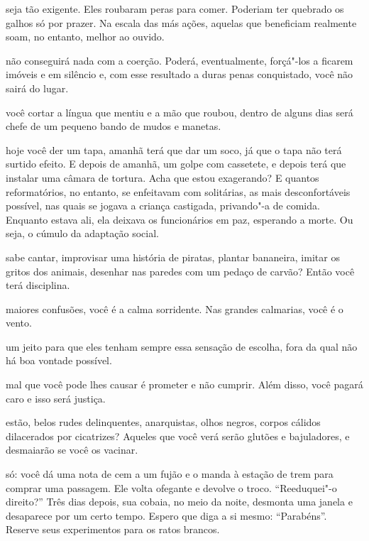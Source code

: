 \bigskip
\bigskip

 seja tão exigente. Eles roubaram peras para comer. Poderiam ter
quebrado os galhos só por prazer. Na escala das más ações, aquelas que
beneficiam realmente soam, no entanto, melhor ao ouvido.

\bigskip
\bigskip

 não conseguirá nada com a coerção. Poderá, eventualmente, forçá"-los
a ficarem imóveis e em silêncio e, com esse resultado a duras penas
conquistado, você não sairá do lugar.



 você cortar a língua que mentiu e a mão que roubou, dentro de alguns
dias será chefe de um pequeno bando de mudos e manetas.



 hoje você der um tapa, amanhã terá que dar um soco, já que o tapa não
terá surtido efeito. E depois de amanhã, um golpe com cassetete, e
depois terá que instalar uma câmara de tortura. Acha que estou
exagerando? E quantos reformatórios, no entanto, se enfeitavam com
solitárias, as mais desconfortáveis possível, nas quais se jogava a
criança castigada, privando"-a de comida. Enquanto estava ali, ela
deixava os funcionários em paz, esperando a morte. Ou seja, o cúmulo da
adaptação social.



 sabe cantar, improvisar uma história de piratas, plantar bananeira,
imitar os gritos dos animais, desenhar nas paredes com um pedaço de
carvão? Então você terá disciplina.

\pagebreak

 maiores confusões, você é a calma sorridente. Nas grandes calmarias,
você é o vento.



 um jeito para que eles tenham sempre essa sensação de escolha, fora
da qual não há boa vontade possível.



 mal que você pode lhes causar é prometer e não cumprir. Além
disso, você pagará caro e isso será justiça.



 estão, belos rudes delinquentes, anarquistas, olhos negros, corpos
cálidos dilacerados por cicatrizes? Aqueles que você verá serão glutões
e bajuladores, e desmaiarão se você os vacinar.


 só: você dá uma nota de cem a um fujão e o manda à estação de trem
para comprar uma passagem. Ele volta ofegante e devolve o troco.
``Reeduquei"-o direito?'' Três dias depois, sua cobaia, no meio da noite,
desmonta uma janela e desaparece por um certo tempo. Espero que diga a
si mesmo: ``Parabéns''. Reserve seus experimentos para os ratos brancos.

